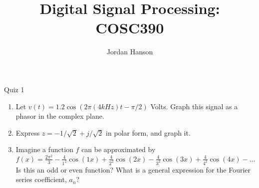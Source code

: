 \documentclass{beamer}
\title{Digital Signal Processing: COSC390}
\author{Jordan Hanson}
\institute{Whittier College Department of Physics and Astronomy}
\begin{document}
\maketitle

\begin{frame}{Quiz 1}
\begin{enumerate}
\item Let $v(t) = 1.2 \cos(2\pi(4 kHz) t - \pi/2)$ Volts.  Graph this signal as a phasor in the complex plane.
\item Express $z = -1/\sqrt{2}+j/\sqrt{2}$ in polar form, and graph it. 
\item Imagine a function $f$ can be approximated by $f(x) = \frac{2\pi^2}{3}-\frac{4}{1^2}\cos(1x)+\frac{4}{2^2}\cos(2x)-\frac{4}{3^2}\cos(3x)+\frac{4}{4^2}\cos(4x)- ...$ Is this an odd or even function?  What is a general expression for the Fourier series coefficient, $a_n$?
\end{enumerate}
\end{frame}
\end{document}
